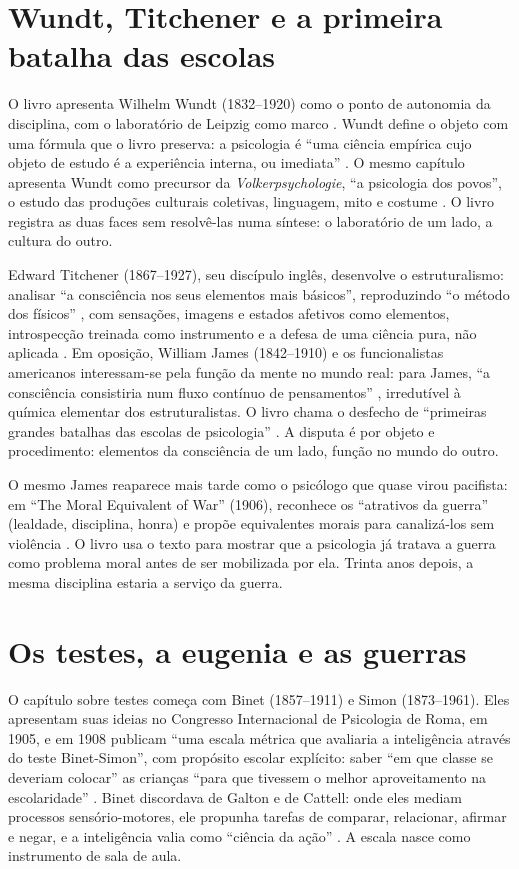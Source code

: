 \documentclass[12pt]{article}
\begin{document}
\section{Wundt, Titchener e a primeira batalha das escolas}

O livro apresenta Wilhelm Wundt (1832--1920) como o ponto de autonomia da disciplina, com o laboratório de Leipzig como marco \cite[p. 10]{machado}. Wundt define o objeto com uma fórmula que o livro preserva: a psicologia é ``uma ciência empírica cujo objeto de estudo é a experiência interna, ou imediata'' \cite[p. 14]{machado}. O mesmo capítulo apresenta Wundt como precursor da \emph{Volkerpsychologie}, ``a psicologia dos povos'', o estudo das produções culturais coletivas, linguagem, mito e costume \cite[p. 10]{machado}. O livro registra as duas faces sem resolvê-las numa síntese: o laboratório de um lado, a cultura do outro.

Edward Titchener (1867--1927), seu discípulo inglês, desenvolve o estruturalismo: analisar ``a consciência nos seus elementos mais básicos'', reproduzindo ``o método dos físicos'' \cite[p. 6]{machado}, com sensações, imagens e estados afetivos como elementos, introspecção treinada como instrumento e a defesa de uma ciência pura, não aplicada \cite[pp. 22--23]{machado}. Em oposição, William James (1842--1910) e os funcionalistas americanos interessam-se pela função da mente no mundo real: para James, ``a consciência consistiria num fluxo contínuo de pensamentos'' \cite[p. 7]{machado}, irredutível à química elementar dos estruturalistas. O livro chama o desfecho de ``primeiras grandes batalhas das escolas de psicologia'' \cite[p. 6]{machado}. A disputa é por objeto e procedimento: elementos da consciência de um lado, função no mundo do outro.

O mesmo James reaparece mais tarde como o psicólogo que quase virou pacifista: em ``The Moral Equivalent of War'' (1906), reconhece os ``atrativos da guerra'' (lealdade, disciplina, honra) e propõe equivalentes morais para canalizá-los sem violência \cite[p. 100]{machado}. O livro usa o texto para mostrar que a psicologia já tratava a guerra como problema moral antes de ser mobilizada por ela. Trinta anos depois, a mesma disciplina estaria a serviço da guerra.

\section{Os testes, a eugenia e as guerras}

O capítulo sobre testes começa com Binet (1857--1911) e Simon (1873--1961). Eles apresentam suas ideias no Congresso Internacional de Psicologia de Roma, em 1905, e em 1908 publicam ``uma escala métrica que avaliaria a inteligência através do teste Binet-Simon'', com propósito escolar explícito: saber ``em que classe se deveriam colocar'' as crianças ``para que tivessem o melhor aproveitamento na escolaridade'' \cite[p. 55]{machado}. Binet discordava de Galton e de Cattell: onde eles mediam processos sensório-motores, ele propunha tarefas de comparar, relacionar, afirmar e negar, e a inteligência valia como ``ciência da ação'' \cite[p. 55]{machado}. A escala nasce como instrumento de sala de aula.
\end{document}
